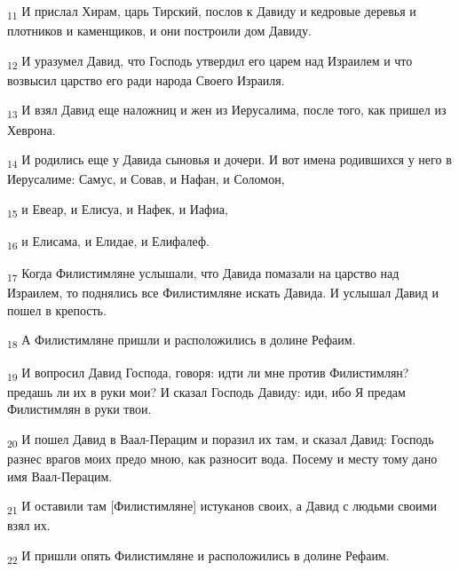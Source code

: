 \begin{tcolorbox}
\textsubscript{11} И прислал Хирам, царь Тирский, послов к Давиду и кедровые деревья и плотников и каменщиков, и они построили дом Давиду.
\end{tcolorbox}
\begin{tcolorbox}
\textsubscript{12} И уразумел Давид, что Господь утвердил его царем над Израилем и что возвысил царство его ради народа Своего Израиля.
\end{tcolorbox}
\begin{tcolorbox}
\textsubscript{13} И взял Давид еще наложниц и жен из Иерусалима, после того, как пришел из Хеврона.
\end{tcolorbox}
\begin{tcolorbox}
\textsubscript{14} И родились еще у Давида сыновья и дочери. И вот имена родившихся у него в Иерусалиме: Самус, и Совав, и Нафан, и Соломон,
\end{tcolorbox}
\begin{tcolorbox}
\textsubscript{15} и Евеар, и Елисуа, и Нафек, и Иафиа,
\end{tcolorbox}
\begin{tcolorbox}
\textsubscript{16} и Елисама, и Елидае, и Елифалеф.
\end{tcolorbox}
\begin{tcolorbox}
\textsubscript{17} Когда Филистимляне услышали, что Давида помазали на царство над Израилем, то поднялись все Филистимляне искать Давида. И услышал Давид и пошел в крепость.
\end{tcolorbox}
\begin{tcolorbox}
\textsubscript{18} А Филистимляне пришли и расположились в долине Рефаим.
\end{tcolorbox}
\begin{tcolorbox}
\textsubscript{19} И вопросил Давид Господа, говоря: идти ли мне против Филистимлян? предашь ли их в руки мои? И сказал Господь Давиду: иди, ибо Я предам Филистимлян в руки твои.
\end{tcolorbox}
\begin{tcolorbox}
\textsubscript{20} И пошел Давид в Ваал-Перацим и поразил их там, и сказал Давид: Господь разнес врагов моих предо мною, как разносит вода. Посему и месту тому дано имя Ваал-Перацим.
\end{tcolorbox}
\begin{tcolorbox}
\textsubscript{21} И оставили там [Филистимляне] истуканов своих, а Давид с людьми своими взял их.
\end{tcolorbox}
\begin{tcolorbox}
\textsubscript{22} И пришли опять Филистимляне и расположились в долине Рефаим.
\end{tcolorbox}
